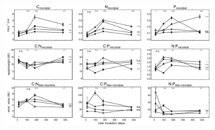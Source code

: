 \documentclass[10pt]{article}
\begin{document}
\begin{flushleft}
\begin{figure}[!ht]
\end{figure}
% 
\begin{figure}[!ht]
\begin{center}
\includegraphics{ligpaper-mb2}
\end{center}
\end{figure}




\end{flushleft}
\end{document}
